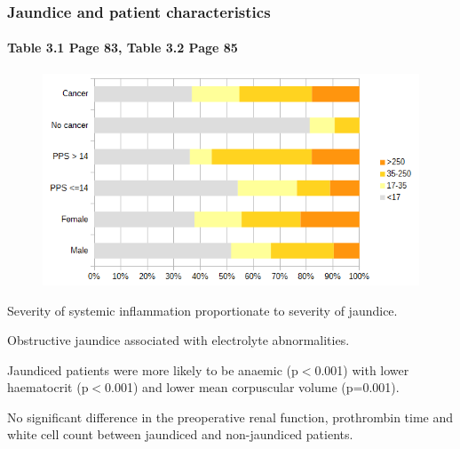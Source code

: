 \documentclass[10pt]{beamer}
\begin{document}
\begin{frame}
	\frametitle{Jaundice and patient characteristics}
	\framesubtitle{Table 3.1 Page 83, Table 3.2 Page 85 }
	\begin{figure}
		\includegraphics[height=0.4\textheight]{jaundice_vs_patient_factors}
	\end{figure}
	{\scriptsize			
	Severity of systemic inflammation proportionate to severity of jaundice. \\
	\medskip
	
	Obstructive jaundice associated with electrolyte abnormalities.\\
	\medskip			
	
	Jaundiced patients were more likely to be anaemic (p$<$0.001) with lower haematocrit (p$<$0.001) and lower mean corpuscular volume (p=0.001).\\
	\medskip
	
	No significant difference in the preoperative renal function, prothrombin time and white cell count between jaundiced and non-jaundiced patients.\\
	}
\end{frame}
\end{document}
